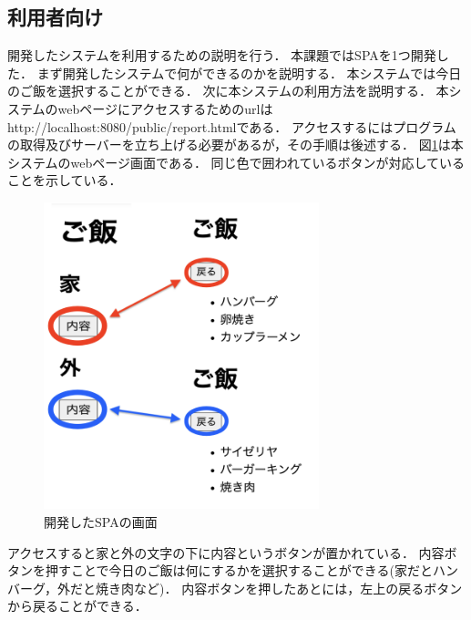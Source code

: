 \documentclass[uplatex,dvipdfmx]{jsarticle}
\begin{document}
\subsection{利用者向け}\label{sec:riyousya}
開発したシステムを利用するための説明を行う．
本課題ではSPAを1つ開発した．
まず開発したシステムで何ができるのかを説明する．
本システムでは今日のご飯を選択することができる．
次に本システムの利用方法を説明する．
本システムのwebページにアクセスするためのurlはhttp://localhost:8080/public/report.htmlである．
アクセスするにはプログラムの取得及びサーバーを立ち上げる必要があるが，その手順は後述する．
図\ref{fig:SPA}は本システムのwebページ画面である．
同じ色で囲われているボタンが対応していることを示している．
\begin{figure}[h]
    \centering
     \centering
    \includegraphics[width=8cm]{fig/SPA.png}
    \caption{開発したSPAの画面}
    \label{fig:SPA}
  \end{figure}
アクセスすると家と外の文字の下に内容というボタンが置かれている．
内容ボタンを押すことで今日のご飯は何にするかを選択することができる(家だとハンバーグ，外だと焼き肉など)．
内容ボタンを押したあとには，左上の戻るボタンから戻ることができる．
\end{document}
